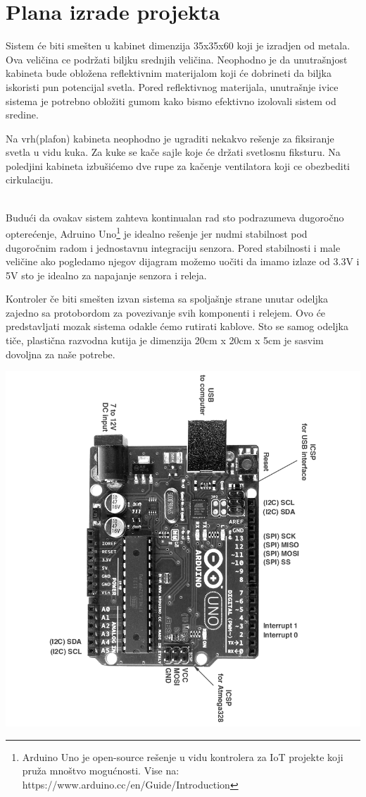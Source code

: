 \documentclass[a4paper,11pt]{book}
\begin{document}
\section{Plana izrade projekta}

Sistem će biti smešten u kabinet dimenzija 35x35x60 koji je izradjen od metala. Ova veličina ce podržati biljku srednjih veličina. Neophodno je da unutrašnjost kabineta bude obložena reflektivnim materijalom koji će dobrineti da biljka iskoristi pun potencijal svetla. Pored reflektivnog materijala, unutrašnje ivice sistema je potrebno obložiti gumom kako bismo efektivno izolovali sistem od sredine.

Na vrh(plafon) kabineta neophodno je ugraditi nekakvo rešenje za fiksiranje svetla u vidu kuka. Za kuke se kače sajle koje će držati svetlosnu fiksturu. Na poledjini kabineta izbušićemo dve rupe za kačenje ventilatora koji ce obezbediti cirkulaciju.

\noindent \\ Budući da ovakav sistem zahteva kontinualan rad sto podrazumeva dugoročno opterećenje, Adruino Uno\footnote{Arduino Uno je open-source rešenje u vidu kontrolera za IoT projekte koji pruža mnoštvo mogućnosti. Vise na: https://www.arduino.cc/en/Guide/Introduction} je idealno rešenje jer nudmi stabilnost pod dugoročnim radom i jednostavnu integraciju senzora. Pored stabilnosti i male veličine ako pogledamo njegov dijagram možemo uočiti da imamo izlaze od 3.3V i 5V sto je idealno za napajanje senzora i releja.

Kontroler če biti smešten izvan sistema sa spoljašnje strane unutar odeljka zajedno sa protobordom za povezivanje svih komponenti i relejem. Ovo će predstavljati mozak sistema odakle ćemo rutirati kablove. Sto se samog odeljka tiče, plastična razvodna kutija je dimenzija 20cm x 20cm x 5cm je sasvim dovoljna za naše potrebe.

\includegraphics[width=\textwidth]{uno_pinout.png}
\end{document}
